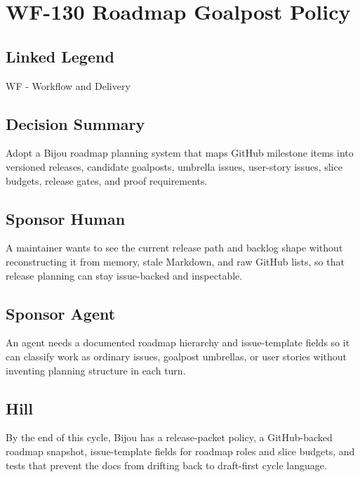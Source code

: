 \chapter{WF-130 Roadmap Goalpost Policy}\label{record-212}

\smallskip

\section{Linked Legend}\label{record-212-linked-legend}

WF - Workflow and Delivery

\section{Decision Summary}\label{record-212-decision-summary}

Adopt a Bijou roadmap planning system that maps GitHub milestone items into versioned releases, candidate goalposts, umbrella issues, user-story issues, slice budgets, release gates, and proof requirements.

\section{Sponsor Human}\label{record-212-sponsor-human}

A maintainer wants to see the current release path and backlog shape without reconstructing it from memory, stale Markdown, and raw GitHub lists, so that release planning can stay issue-backed and inspectable.

\section{Sponsor Agent}\label{record-212-sponsor-agent}

An agent needs a documented roadmap hierarchy and issue-template fields so it can classify work as ordinary issues, goalpost umbrellas, or user stories without inventing planning structure in each turn.

\section{Hill}\label{record-212-hill}

By the end of this cycle, Bijou has a release-packet policy, a GitHub-backed roadmap snapshot, issue-template fields for roadmap roles and slice budgets, and tests that prevent the docs from drifting back to draft-first cycle language.

